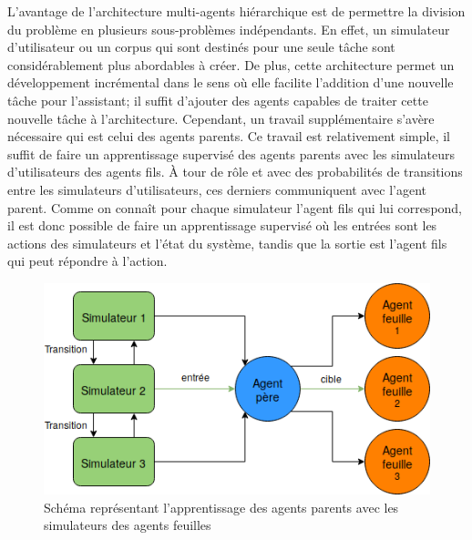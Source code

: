 L'avantage de l'architecture multi-agents hiérarchique est de permettre la division du problème en plusieurs sous-problèmes indépendants. En effet, un simulateur d'utilisateur ou un corpus qui sont destinés pour une seule tâche sont considérablement plus abordables à créer. De plus, cette architecture permet un développement incrémental dans le sens où elle facilite l'addition d'une nouvelle tâche pour l'assistant; il suffit d'ajouter des agents capables de traiter cette nouvelle tâche à l'architecture. Cependant, un travail supplémentaire s'avère nécessaire qui est celui des agents parents. Ce travail est relativement simple, il suffit de faire un apprentissage supervisé des agents parents avec les simulateurs d'utilisateurs des agents fils. À tour de rôle et avec des probabilités de transitions entre les simulateurs d'utilisateurs, ces derniers communiquent avec l'agent parent. Comme on connaît pour chaque simulateur l'agent fils qui lui correspond, il est donc possible de faire un apprentissage supervisé où les entrées sont les actions des simulateurs et l'état du système, tandis que la sortie est l'agent fils qui peut répondre à l'action.
\begin{figure}[H] 
	
	\centering
	\includegraphics[width=0.5\linewidth]{images/Conception/DM/train_parent.png}
	\caption{Schéma représentant l'apprentissage des agents parents avec les simulateurs des agents feuilles}
\end{figure}\label{train_parent}
